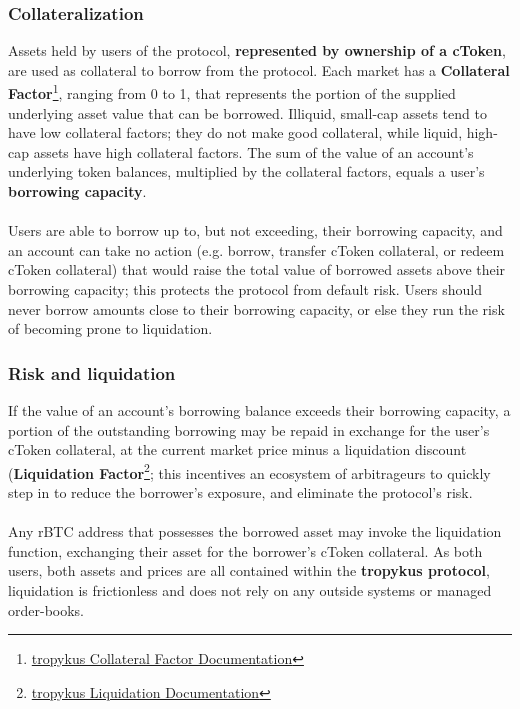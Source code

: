 \documentclass{article}
\begin{document}
\subsubsection{Collateralization}
Assets held by users of the protocol, \textbf{represented by ownership of a cToken}, are used as collateral to borrow from the protocol. Each market has a \textbf{Collateral Factor}\footnote{\href{https://test.tropykus.app/docs/keyConcepts\#ctokens}{tropykus Collateral Factor Documentation}}, ranging from 0 to 1, that represents the portion of the supplied underlying asset value that can be borrowed. Illiquid, small-cap assets tend to have low collateral factors; they do not make good collateral, while liquid, high-cap assets have high collateral factors. The sum of the value of an account's underlying token balances, multiplied by the collateral factors, equals a user's \textbf{borrowing capacity}.
\\
\\
Users are able to borrow up to, but not exceeding, their borrowing capacity, and an account can
take no action (e.g. borrow, transfer cToken collateral, or redeem cToken collateral) that would
raise the total value of borrowed assets above their borrowing capacity; this protects the protocol
from default risk. Users should never borrow amounts close to their borrowing capacity, or else they run the risk of becoming prone to liquidation.

\subsubsection{Risk and liquidation}
If the value of an account's borrowing balance exceeds their borrowing capacity, a portion of
the outstanding borrowing may be repaid in exchange for the user's cToken collateral, at the current market price minus a liquidation discount (\textbf{Liquidation Factor}\footnote{\href{https://test.tropykus.app/docs/keyConcepts\#liquidation}{tropykus Liquidation Documentation}}; this incentives an ecosystem of arbitrageurs to quickly step in to reduce the borrower's exposure, and eliminate the protocol's risk.
\\ \\
Any rBTC address that possesses the borrowed asset may invoke the liquidation function, exchanging their asset for the borrower's cToken collateral. As both users, both assets and prices
are all contained within the \textbf{tropykus protocol}, liquidation is frictionless and does not rely on any outside systems or managed order-books.
\end{document}
